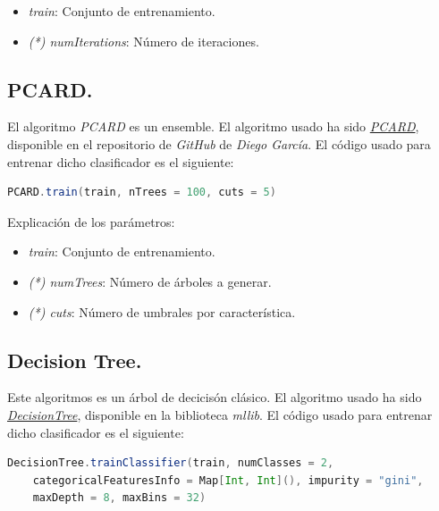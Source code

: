 \documentclass[11pt]{article}
\begin{document}
\begin{itemize}
	\item \textit{train}: Conjunto de entrenamiento.
	\item \textit{(*) numIterations}: Número de iteraciones.
\end{itemize}

\subsection{PCARD.}

El algoritmo \textit{PCARD} es un ensemble. El algoritmo usado ha sido \href{https://github.com/djgarcia/PCARD}{\textit{PCARD}}, disponible en el repositorio de \textit{GitHub} de \textit{Diego García}. El código usado para entrenar dicho clasificador es el siguiente:

\begin{lstlisting}[frame=single, language=scala, xleftmargin=.25in, basicstyle=\small, upquote=true, breaklines = true]
PCARD.train(train, nTrees = 100, cuts = 5)
\end{lstlisting}

Explicación de los parámetros:

\begin{itemize}
	\item \textit{train}: Conjunto de entrenamiento.
	\item \textit{(*) numTrees}: Número de árboles a generar.
	\item \textit{(*) cuts}: Número de umbrales por característica.
\end{itemize}

\subsection{Decision Tree.}

Este algoritmos es un árbol de decicisón clásico. El algoritmo usado ha sido \href{https://spark.apache.org/docs/2.2.0/api/scala/index.html#org.apache.spark.mllib.tree.DecisionTree}{\textit{DecisionTree}}, disponible en la biblioteca \textit{mllib}. El código usado para entrenar dicho clasificador es el siguiente:

\begin{lstlisting}[frame=single, language=scala, xleftmargin=.25in, basicstyle=\small, upquote=true, breaklines = true]
DecisionTree.trainClassifier(train, numClasses = 2, 
	categoricalFeaturesInfo = Map[Int, Int](), impurity = "gini", 
	maxDepth = 8, maxBins = 32)
\end{lstlisting}
\end{document}
